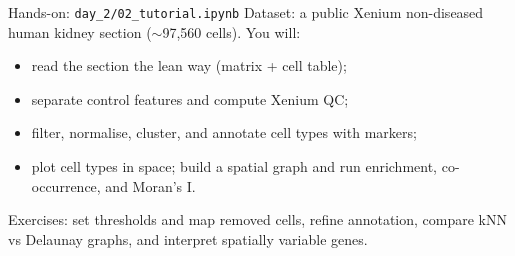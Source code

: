 \documentclass[aspectratio=169]{beamer}
\begin{document}
\begin{frame}{Hands-on: \texttt{day\_2/02\_tutorial.ipynb}}
  Dataset: a public Xenium non-diseased human kidney section ($\sim$97{,}560 cells).
  You will:
  \begin{itemize}
    \item read the section the lean way (matrix + cell table);
    \item separate control features and compute Xenium QC;
    \item filter, normalise, cluster, and annotate cell types with markers;
    \item plot cell types in space; build a spatial graph and run enrichment,
      co-occurrence, and Moran's I.
  \end{itemize}
  Exercises: set thresholds and map removed cells, refine annotation, compare kNN vs
  Delaunay graphs, and interpret spatially variable genes.
\end{frame}
\end{document}
